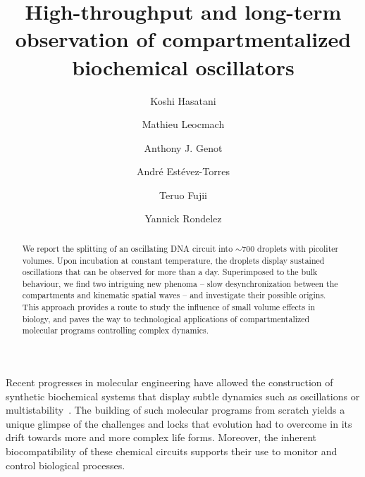 \documentclass[prl,aps,reprint,
 amsmath,amssymb,superscriptaddress]{revtex4-1}
\begin{document}
\title{High-throughput and long-term observation of compartmentalized biochemical oscillators}

\author{Koshi Hasatani}

\author{Mathieu Leocmach}

\author{Anthony J. Genot}

\author{André Estévez-Torres}

\author{Teruo Fujii}

\author{Yannick Rondelez}

\begin{abstract}
We report the splitting of an oscillating DNA circuit into $\sim 700$ droplets with picoliter volumes. Upon incubation at constant temperature, the droplets display sustained oscillations that can be observed for more than a day. Superimposed to the bulk behaviour, we find two intriguing new phenoma -- slow desynchronization between the compartments and kinematic spatial waves -- and investigate their possible origins. This approach provides a route to study the influence of small volume effects in biology, and paves the way to technological applications of compartmentalized molecular programs controlling complex dynamics.
\end{abstract}
\maketitle

Recent progresses in molecular engineering have allowed the construction of synthetic biochemical systems that display  subtle dynamics such as oscillations or multistability~\cite{Kim2006,Montagne2011,Kim2011,Padirac2012}. The building of such molecular programs from scratch yields a unique glimpse of the challenges and locks that evolution had to overcome in its drift towards more and more complex life forms. Moreover, the inherent biocompatibility of these chemical circuits supports their use to monitor and control biological processes. 
\end{document}
